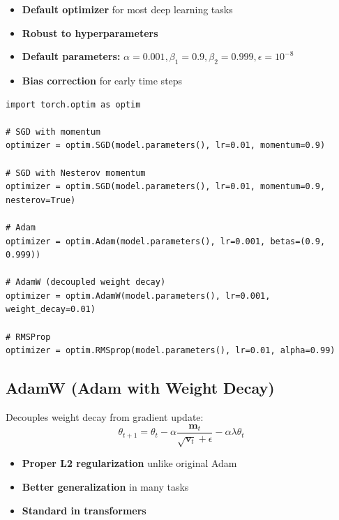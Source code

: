 \begin{properties}
\begin{itemize}
    \item \textbf{Default optimizer} for most deep learning tasks
    \item \textbf{Robust to hyperparameters}
    \item \textbf{Default parameters:} $\alpha = 0.001, \beta_1 = 0.9, \beta_2 = 0.999, \epsilon = 10^{-8}$
    \item \textbf{Bias correction} for early time steps
\end{itemize}
\end{properties}

\begin{code}
    \label{code:optimizers}
\begin{verbatim}
import torch.optim as optim

# SGD with momentum
optimizer = optim.SGD(model.parameters(), lr=0.01, momentum=0.9)

# SGD with Nesterov momentum
optimizer = optim.SGD(model.parameters(), lr=0.01, momentum=0.9, nesterov=True)

# Adam
optimizer = optim.Adam(model.parameters(), lr=0.001, betas=(0.9, 0.999))

# AdamW (decoupled weight decay)
optimizer = optim.AdamW(model.parameters(), lr=0.001, weight_decay=0.01)

# RMSProp
optimizer = optim.RMSprop(model.parameters(), lr=0.01, alpha=0.99)
\end{verbatim}
\end{code}

\subsection{AdamW (Adam with Weight Decay)}

Decouples weight decay from gradient update:
\begin{equation}
\theta_{t+1} = \theta_t - \alpha \frac{\mathbf{m}_t}{\sqrt{\mathbf{v}_t} + \epsilon} - \alpha \lambda \theta_t
\end{equation}

\begin{itemize}
    \item \textbf{Proper L2 regularization} unlike original Adam
    \item \textbf{Better generalization} in many tasks
    \item \textbf{Standard in transformers}
\end{itemize}

